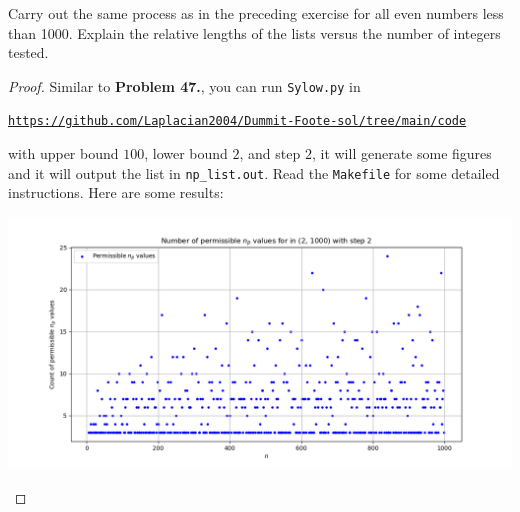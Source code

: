 \documentclass{article}
\newenvironment{problem}[2][Problem]{\begin{trivlist}
\item[\hskip \labelsep {\bfseries #1}\hskip \labelsep {\bfseries #2.}]}{\end{trivlist}}
\begin{document}
\begin{problem}{48}
    Carry out the same process as in the preceding exercise for all even numbers less than 1000. Explain the relative lengths of the lists versus the number of integers tested.
\end{problem}
\begin{proof}
    Similar to \textbf{Problem 47.}, you can run \texttt{Sylow.py} in 
    \begin{center}
        \texttt{\url{https://github.com/Laplacian2004/Dummit-Foote-sol/tree/main/code}}
    \end{center}
    with upper bound $100$, lower bound $2$, and step $2$, it will generate some figures and it will output the list in \texttt{np\_list.out}. Read the \texttt{Makefile} for some detailed instructions. Here are some results:
\begin{center}
        \includegraphics[width=0.75\linewidth]{picture/exercise 4.5.48.png}
\begin{figure}[htbp]
    

\end{figure}
\end{center}
\end{proof}
\end{document}
